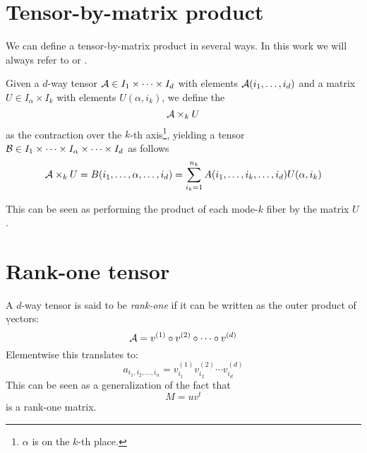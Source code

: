 \section{Tensor-by-matrix product}
We can define a tensor-by-matrix product in several ways. In this work we will always refer to  or .

\begin{Def} \label{def:tensor-matrix-product}
  Given a $d$-way tensor $\mathcal{A} \in I_1 \times \cdots \times I_d$ with elements $\mathcal{A}(i_1,\ldots,i_d)$ and a matrix $U \in I_\alpha \times I_k$ with elements $U(\alpha,i_k)$, we define the 
  \begin{equation*}
    \mathcal{A} \times_k U
  \end{equation*}
  as the contraction over the $k$-th axis\footnote{$\alpha$ is on the $k$-th place.}, yielding a tensor $\mathcal{B} \in I_1 \times \cdots \times I_\alpha \times \cdots \times I_d$ as follows
  \begin{equation*}
    \mathcal{A} \times_k U = B(i_1,\ldots,\alpha,\ldots,i_d) = \sum_{i_k = 1}^{n_k} A(i_1,\ldots,i_k,\ldots,i_d) U(\alpha,i_k)
  \end{equation*}
\end{Def}
This can be seen as performing the product of each mode-$k$ fiber by the matrix $U$.

\section{Rank-one tensor}
A $d$-way tensor \A is said to be \emph{rank-one} if it can be written as the outer product of \d vectors:
\begin{equation}
  \mathcal{A} = v^{(1)} \circ v^{(2)} \circ \cdots \circ v^{(d)}
\end{equation}
Elementwise this translates to:
\begin{equation}
  a_{i_1,i_2,\ldots,i_n} = v_{i_1}^{(1)} v_{i_2}^{(2)} \cdots v_{i_d}^{(d)}
\end{equation}
This can be seen as a generalization of the fact that
\begin{equation*}
  M = u v^t
\end{equation*}
is a rank-one matrix.

